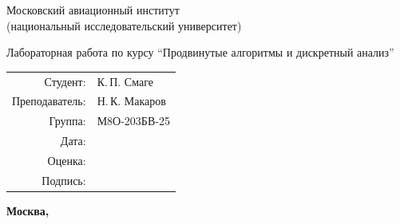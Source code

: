 \begin{titlepage}
\begin{center}
\bfseries

{\Large Московский авиационный институт\\ (национальный исследовательский университет)

}

\vspace{48pt}

Лабораторная работа  по курсу \enquote{Продвинутые алгоритмы и дискретный анализ}

\end{center}

\vspace{72pt}

\begin{flushright}
\begin{tabular}{rl}
Студент: & К.\,П. Смаге \\
Преподаватель: & Н.\,К. Макаров \\
Группа: & М8О-203БВ-25 \\
Дата: & \\
Оценка: & \\
Подпись: & \\
\end{tabular}
\end{flushright}

\vfill

\begin{center}
\bfseries
Москва, \the\year
\end{center}
\end{titlepage}

\pagebreak
